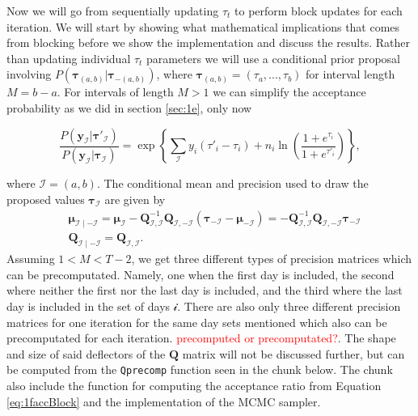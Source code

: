 \documentclass[
]{article}
\begin{document}
Now we will go from sequentially updating \(\tau_t\) to perform block updates for each iteration. We will start by showing what mathematical implications that comes from blocking before we show the implementation and discuss the results. Rather than updating individual \(\tau_t\) parameters we will use a conditional prior proposal involving \(P( \boldsymbol{\tau}_{(a,b)}| \boldsymbol{\tau}_{-(a,b)})\), where \(\boldsymbol{\tau}_{(a,b)} = (\tau_a,...,\tau_b)\) for interval length \(M=b-a\). For intervals of length \(M>1\) we can simplify the acceptance probability as we did in section \ref{sec:1e}, only now

\begin{equation}\label{eq:1faccBlock}
  \frac{P(\boldsymbol{y}_\mathcal{I}| \boldsymbol{\tau}'_ \mathcal{I})}{P(\boldsymbol{y}_\mathcal{I}| \boldsymbol{\tau}_ \mathcal{I})}
  =
  \exp\left\{ \sum_{\mathcal{I}}y_i(\tau'_i - \tau_i) + n_i \ln \left( \frac{1+e^{\tau_i}}{1+e^{\tau'_i}} \right) \right\},
\end{equation}

where \(\mathcal{I}=(a,b)\). The conditional mean and precision used to draw the proposed values \(\boldsymbol{\tau}_ \mathcal{I}\) are given by
\[
\begin{aligned}
  &\boldsymbol{\mu}_{ \mathcal{I} \mid \mathcal{-I}} = \boldsymbol{\mu}_{\mathcal{I}} - \mathbf{Q}_{\mathcal{I}, \mathcal{I}}^{-1} \mathbf{Q}_{\mathcal{I},\mathcal{-I}} \left(\boldsymbol{\tau}_{\mathcal{-I}}-\boldsymbol{\mu}_{\mathcal{-I}}\right) 
  = -\mathbf{Q}_{\mathcal{I},\mathcal{I}}^{-1} \mathbf{Q}_{\mathcal{I},\mathcal{-I}}\boldsymbol{\tau}_{\mathcal{-I}}
  \\
  &\mathbf{Q}_{\mathcal{I} \mid \mathcal{-I}}=\mathbf{Q}_{\mathcal{I},\mathcal{I}}.
\end{aligned}
\]
Assuming \(1<M<T-2\), we get three different types of precision matrices which can be precomputated. Namely, one when the first day is included, the second where neither the first nor the last day is included, and the third where the last day is included in the set of days \(\mathcal{i}\). There are also only three different precision matrices for one iteration for the same day sets mentioned which also can be precomputated for each iteration. \textcolor{red}{precomputed or precomputated?}. The shape and size of said deflectors of the \(\mathbf{Q}\) matrix will not be discussed further, but can be computed from the \texttt{Qprecomp} function seen in the chunk below. The chunk also include the function for computing the acceptance ratio from Equation \eqref{eq:1faccBlock} and the implementation of the MCMC sampler.
\end{document}
